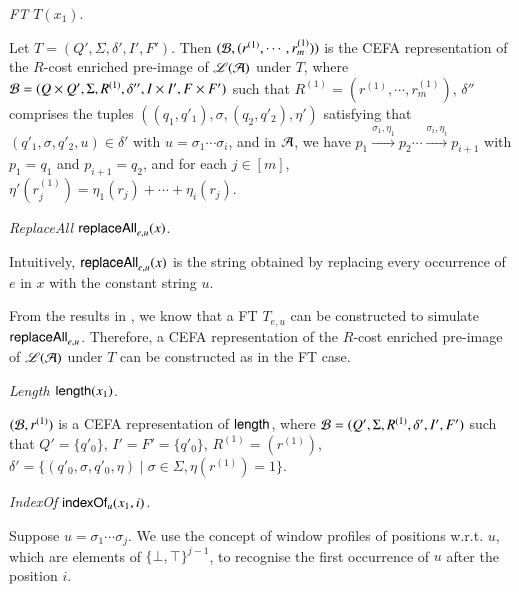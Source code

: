 \smallskip
\noindent \emph{FT $T(x_1)$}.

\smallskip

Let $T= (Q', \Sigma, \delta', I', F')$. Then $(\mathcal{B}, (r^{(1)}, \cdots, r^{(1)}_m))$ is the CEFA representation of the $R$-cost enriched pre-image of $\mathscr{L}(\mathcal{A})$ under $T$, where $ \mathcal{B}= (Q \times Q', \Sigma, R^{(1)}, \delta'', I \times I', F \times F')$ such that $R^{(1)}  = (r^{(1)}, \cdots, r^{(1)}_m)$, $\delta''$ comprises the tuples $((q_1, q'_1), \sigma, (q_2, q'_2), \eta')$ satisfying that $(q'_1, \sigma, q'_2, u) \in \delta'$ with $u = \sigma_1 \cdots \sigma_i$, and in $\mathcal{A}$, we have $p_1 \xrightarrow{\sigma_1, \eta_1} p_2 \cdots \xrightarrow{\sigma_i, \eta_i} p_{i+1}$ with $p_1 = q_1$ and $p_{i+1}= q_2$, and for each $j \in [m]$,  $\eta'(r^{(1)}_j) = \eta_1(r_j) + \cdots + \eta_i(r_j)$.
%

\smallskip 

\noindent \emph{ReplaceAll $\mathsf{replaceAll}_{e,u}(x)$}.

\smallskip

Intuitively, $\mathsf{replaceAll}_{e,u}(x)$ is the string obtained by replacing every occurrence of $e$ in $x$ with the constant string $u$.

From the results in \cite{CCH+18}, we know that  a FT $T_{e,u}$ can be constructed to simulate $\mathsf{replaceAll}_{e,u}$. 
Therefore, a CEFA representation of the $R$-cost enriched pre-image of $\mathscr{L}(\mathcal{A})$ under $T$ can be constructed as in the FT case.
% 

\smallskip 

\noindent \emph{Length $\mathsf{length}(x_1)$}.

\smallskip

$(\mathcal{B}, r^{(1)})$ is a CEFA representation of $\mathsf{length}$, where $\mathcal{B} = (Q', \Sigma, R^{(1)}, \delta', I', F')$ such that $Q' = \{q'_0\}$, $I'=F'=\{q'_0\}$, $R^{(1)} = (r^{(1)})$, $\delta' = \{(q'_0, \sigma, q'_0, \eta) \mid \sigma \in \Sigma, \eta(r^{(1)}) = 1\}$.

\smallskip 

\noindent \emph{IndexOf $\mathsf{indexOf}_u(x_1, i)$}.

\smallskip

Suppose $u = \sigma_1 \cdots \sigma_j$. We use the concept of window profiles of positions w.r.t. $u$, which are elements of $\{\bot, \top\}^{j-1}$, to recognise the first occurrence of $u$ after the position $i$. 

